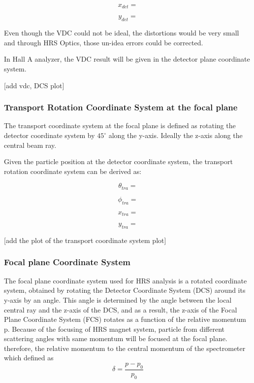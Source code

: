 \begin{equation}
    x_{det} =
\end{equation}

\begin{equation}
    y_{det} =
\end{equation}

Even though the VDC could not be ideal, the distortions would be very small and through HRS Optics, those un-idea errors could be corrected. 

In Hall A analyzer, the VDC result will be given in the detector plane coordinate system.

[add vdc, DCS plot]

\subsubsection{Transport Rotation Coordinate System at the focal plane}
The transport coordinate system at the focal plane is defined as rotating the detector coordinate system by $45^{\circ}$ along the y-axis. Ideally the z-axis along the central beam ray. 

Given the particle position at the detector coordinate system, the transport rotation coordinate system can be derived as:

\begin{equation}
    \theta_{tra}  = 
\end{equation}

\begin{equation}
    \phi_{tra} =
\end{equation}

\begin{equation}
    x_{tra} =
\end{equation}

\begin{equation}
    y_{tra} = 
\end{equation}


[add the plot of the transport coordinate system plot]


\subsubsection{Focal plane Coordinate System}

The focal plane coordinate system used for HRS analysis is a rotated coordinate system, obtained by rotating the Detector Coordinate System (DCS) around its y-axis by an angle. This angle is determined by the angle between the local central ray and the z-axis of the DCS, and as a result, the z-axis of the Focal Plane Coordinate System (FCS) rotates as a function of the relative momentum p. Because of the focusing of HRS magnet system,  particle from different scattering angles with same momentum will be focused at the focal plane. therefore, the relative momentum to the central momentum of the spectrometer which defined as 
\begin{equation}
    \delta = \frac{p-p_0}{p_0}
\end{equation}

